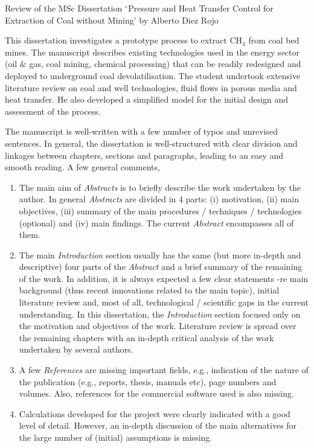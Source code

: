 \documentclass[14pt,twoside]{report}
\begin{document}
\clearpage



\bigskip

\begin{center}
{\Large Review of the MSc Dissertation $\lq$Pressure and Heat Transfer Control for Extraction of Coal without Mining' by Alberto Diez Rojo}
\end{center}

\medskip

This dissertation investigates a prototype process to extract CH$_{4}$ from coal bed mines. The manuscript describes existing technologies used in the energy sector (oil $\&$ gas, coal mining, chemical processing) that can be readily redesigned and deployed to underground coal devolatilisation. The student undertook extensive literature review on coal and well technologies, fluid flows in porous media and heat transfer. He also developed a simplified model for the initial design and assessment of the process. 

The manuscript is well-written with a few number of typos and unrevised sentences. In general, the dissertation is well-structured with clear division and linkages between chapters, sections and paragraphs, leading to an easy and smooth reading. A few general comments,
\begin{enumerate}
\item The main aim of {\it Abstracts} is to briefly describe the work undertaken by the author. In general {\it Abstracts} are divided in 4 parts: (i) motivation, (ii) main objectives, (iii) summary of the main procedures / techniques / technologies (optional) and (iv) main findings. The current {\it Abstract} encompasses all of them.
%
\item The main {\it Introduction} section usually has the same (but more in-depth and descriptive) four parts of the {\it Abstract} and a brief summary of the remaining of the work. In addition, it is always expected a few clear statements -re main background (thus recent innovations related to the main topic), initial literature review and, most of all, technological / scientific gaps in the current understanding. In this dissertation, the {\it Introduction} section focused only on the motivation and objectives of the work. Literature review is spread over the remaining chapters with an in-depth critical analysis of the work undertaken by several authors. 
%
\item A few {\it References} are missing important fields, e.g., indication of the nature of the publication (e.g., reports, thesis, manuals etc), page numbers and volumes. Also, references for the commercial software used is also missing.
%
\item Calculations developed for the project were clearly indicated with a good level of detail. However, an in-depth discussion of the main alternatives for the large number of (initial) assumptions is missing. 
% 
\end{enumerate}
\end{document}
